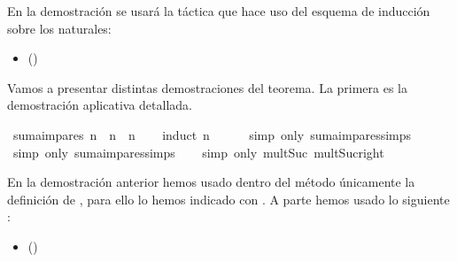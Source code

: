 \begin{isabellebody}
%
\isadelimdocument
%
\endisadelimdocument
%
\begin{isamarkuptext}%
En la demostración se usará la táctica  que hace
  uso del esquema de inducción sobre los naturales:
  \begin{itemize}
  \item[]  
          \hfill ()
  \end{itemize}

  Vamos a presentar distintas demostraciones del teorema. La 
  primera es la demostración aplicativa detallada.%
\end{isamarkuptext}\isamarkuptrue%
\isamarkupfalse%
\ {\isachardoublequoteopen}suma{\isacharunderscore}impares\ n\ {\isacharequal}\ n\ {\isacharasterisk}\ n{\isachardoublequoteclose}\isanewline
%
\isadelimproof
\ \ %
\endisadelimproof
%
\isatagproof
{}\isamarkupfalse%
\ {\isacharparenleft}induct\ n{\isacharparenright}\ \isanewline
\ \ \ \isamarkupfalse%
\ {\isacharparenleft}simp\ only{\isacharcolon}\ suma{\isacharunderscore}impares{\isachardot}simps{\isacharparenleft}{}{\isacharparenright}{\isacharparenright}\isanewline
\ \ \isamarkupfalse%
\ {\isacharparenleft}simp\ only{\isacharcolon}\ suma{\isacharunderscore}impares{\isachardot}simps{\isacharparenleft}{}{\isacharparenright}{\isacharparenright}\isanewline
\ \ \isamarkupfalse%
\ {\isacharparenleft}simp\ only{\isacharcolon}\ mult{\isacharunderscore}Suc\ mult{\isacharunderscore}Suc{\isacharunderscore}right{\isacharparenright}\isanewline
\ \ \isamarkupfalse%
%
\endisatagproof
{\isafoldproof}%
%
\isadelimproof
%
\endisadelimproof
%
\begin{isamarkuptext}%
En la demostración anterior hemos usado dentro del método 
 únicamente la definición de ,
 para ello lo  hemos indicado con . A parte hemos
 usado lo siguiente :
  \begin{itemize}
  \item[]  
          \hfill ()
  \end{itemize}
  \begin{itemize}

\end{itemize}
\end{isamarkuptext}
\end{isabellebody}
